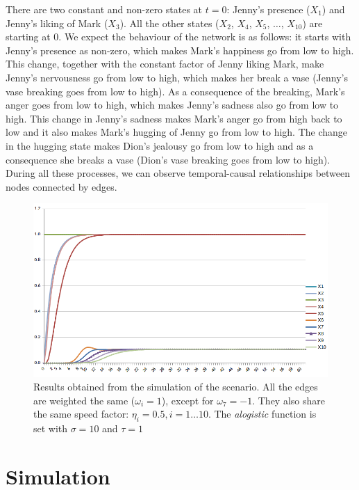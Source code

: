 \documentclass[a4paper]{article}
\begin{document}
There are two constant and non-zero states at $t = 0$: Jenny's presence ($X_{1}$) and Jenny's liking of Mark ($X_{3}$). All the other states ($X_{2}$, $X_{4}$, $X_{5}$, $\ldots$, $X_{10}$) are starting at $0$. We expect the behaviour of the network is as follows: it starts with Jenny's presence as non-zero, which makes Mark's happiness go from low to high. This change, together with the constant factor of Jenny liking Mark, make Jenny's nervousness go from low to high, which makes her break a vase (Jenny's vase breaking goes from low to high). As a consequence of the breaking, Mark's anger goes from low to high, which makes Jenny's sadness also go from low to high. This change in Jenny's sadness makes Mark's anger go from high back to low and it also makes Mark's hugging of Jenny go from low to high. The change in the hugging state makes Dion's jealousy go from low to high and as a consequence she breaks a vase (Dion's vase breaking goes from low to high). During all these processes, we can observe temporal-causal relationships between nodes connected by edges.

\begin{figure}[!ht]
\center
\includegraphics[width=\textwidth]{res/img/numerical_representation}
\caption{Results obtained from the simulation of the scenario. All the edges are weighted the same ($\omega_{i} = 1$), except for $\omega_{7} = -1$. They also share the same speed factor: $\eta_{i} = 0.5,  i = 1 \ldots 10$. The \textit{alogistic} function is set with $\sigma = 10$ and $\tau = 1$}
\label{fig:numerical_representation}
\end{figure}

\section{Simulation}
\end{document}
